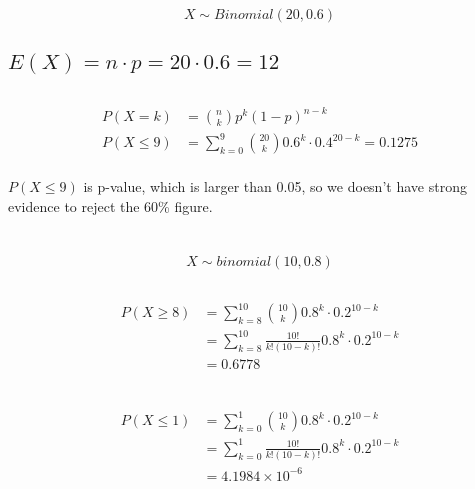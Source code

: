 \documentclass{homework}
\begin{document}

\section{}

\[X \sim Binomial(20, 0.6)\]

\subsection{$E(X)=n\cdot p = 20 \cdot 0.6 = 12$}

\subsection{}

\begin{align*}
    P(X = k) &= \binom{n}{k} p^k (1-p)^{n-k} \\
    P(X \leq 9) &= \sum_{k=0}^{9} \binom{20}{k} 0.6^k \cdot 0.4^{20-k} = 0.1275 \\ %
\end{align*}

$P(X \leq 9)$ is p-value, which is larger than 0.05, so we doesn't have strong evidence to reject the 60\% figure.

\section{}

\[
X \sim binomial(10, 0.8)
\]

\subsection{}

\begin{align*}
    P(X \geq 8) &= \sum_{k=8}^{10} \binom{10}{k} 0.8^k \cdot 0.2^{10-k} \\
    &= \sum_{k=8}^{10}\frac{10!}{k!(10-k)!} 0.8^k \cdot 0.2^{10-k} \\
    &= 0.6778 \\
\end{align*}

\subsection{}

\begin{align*}
    P(X \leq 1) &= \sum_{k=0}^{1} \binom{10}{k} 0.8^k \cdot 0.2^{10-k} \\
    &= \sum_{k=0}^{1}\frac{10!}{k!(10-k)!} 0.8^k \cdot 0.2^{10-k} \\
    &= 4.1984 \times 10^{-6}
\end{align*}
\end{document}
